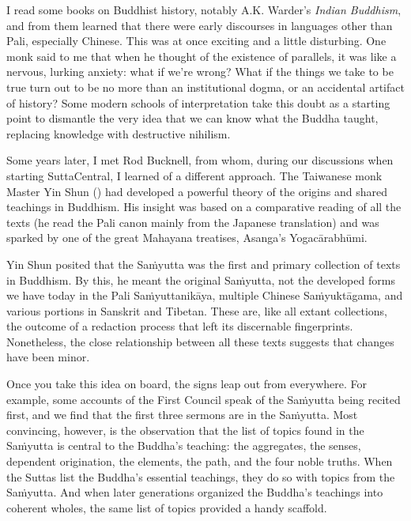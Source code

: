 \documentclass[12pt,openany]{book}%
\newcommand*{\langlzh}[1]{\cjk{#1}\normalfont}%
\begin{document}
I read some books on Buddhist history, notably A.K. Warder’s \textit{Indian Buddhism}, and from them learned that there were early discourses in languages other than Pali, especially Chinese. This was at once exciting and a little disturbing. One monk said to me that when he thought of the existence of parallels, it was like a nervous, lurking anxiety: what if we’re wrong? What if the things we take to be true turn out to be no more than an institutional dogma, or an accidental artifact of history? Some modern schools of interpretation take this doubt as a starting point to dismantle the very idea that we can know what the Buddha taught, replacing knowledge with destructive nihilism.

Some years later, I met Rod Bucknell, from whom, during our discussions when starting SuttaCentral, I learned of a different approach. The Taiwanese monk Master Yin Shun (\langlzh{印順}) had developed a powerful theory of the origins and shared teachings in Buddhism. His insight was based on a comparative reading of all the texts (he read the Pali canon mainly from the Japanese translation) and was sparked by one of the great Mahayana treatises, Asanga’s \textsanskrit{Yogacārabhūmi}. 

Yin Shun posited that the \textsanskrit{Saṁyutta} was the first and primary collection of texts in Buddhism. By this, he meant the original \textsanskrit{Saṁyutta}, not the developed forms we have today in the Pali \textsanskrit{Saṁyuttanikāya}, multiple Chinese \textsanskrit{Saṁyuktāgama}, and various portions in Sanskrit and Tibetan. These are, like all extant collections, the outcome of a redaction process that left its discernable fingerprints. Nonetheless, the close relationship between all these texts suggests that changes have been minor.

Once you take this idea on board, the signs leap out from everywhere. For example, some accounts of the First Council speak of the \textsanskrit{Saṁyutta} being recited first, and we find that the first three sermons are in the \textsanskrit{Saṁyutta}. Most convincing, however, is the observation that the list of topics found in the \textsanskrit{Saṁyutta} is central to the Buddha’s teaching: the aggregates, the senses, dependent origination, the elements, the path, and the four noble truths. When the Suttas list the Buddha’s essential teachings, they do so with topics from the \textsanskrit{Saṁyutta}. And when later generations organized the Buddha’s teachings into coherent wholes, the same list of topics provided a handy scaffold.
\end{document}
